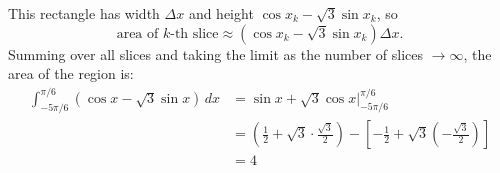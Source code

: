 \documentclass[main]{subfiles}
\begin{document}
\begin{enumerate}
\begin{enumerate}
\begin{solution}
\begin{center}
      \end{center}
      This rectangle has width $\Delta x$ and height $\cos x_k - \sqrt{3}
      \sin x_k$, so
      \[ \text{area of $k$-th slice} \approx \left( \cos x_k - \sqrt{3}
        \sin x_k \right) \Delta x.\]
      Summing over all slices and taking the limit as the number of slices
      $\to \infty$, the area of the region is:
      \begin{align*}
        \int_{-5 \pi/6}^{\pi/6} (\cos x - \sqrt{3} \sin x)\,dx &= \sin x +
        \sqrt{3} \cos x \Big|_{-5 \pi/6}^{\pi / 6} \\
        &= \left( \frac{1}{2} + \sqrt{3} \cdot \frac{\sqrt{3}}{2} \right)
        - \left[ - \frac{1}{2} + \sqrt{3} \left( - \frac{\sqrt{3}}{2}
          \right) \right] \\
        &= \boxed{4}
      \end{align*}
    \end{solution}
  \end{enumerate}

\end{enumerate}
\end{document}
